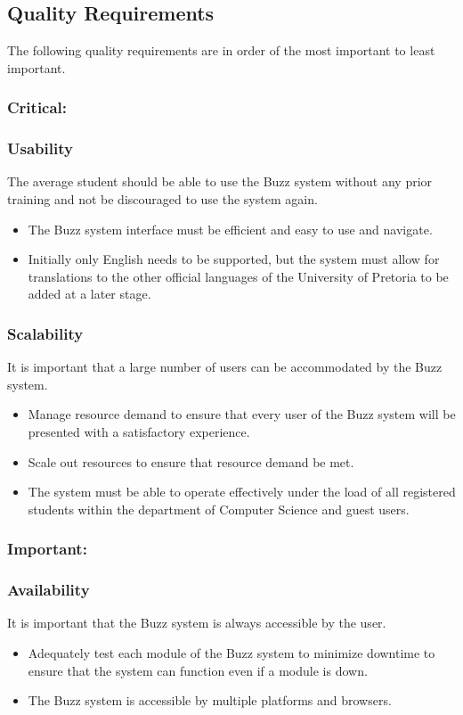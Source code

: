 \documentclass[12pt, oneside]{article}
\begin{document}
	\subsection{Quality Requirements}
	
	The following quality requirements are in order of the most important to least important.	
	\subsubsection{Critical:}
	\subsubsection*{Usability}
	The average student should be able to use the Buzz system without any prior training and not be discouraged to use the system again. 
	\begin{itemize}
		\item The Buzz system interface must be efficient and easy to use and navigate.
		\item Initially only English needs to be supported, but the system must allow for translations to the other official languages of the University of Pretoria to be added at a later stage.
	\end{itemize}
	
	\subsubsection*{Scalability}
	It is important that a large number of users can be accommodated by the Buzz system.
	\begin{itemize} 
		\item Manage resource demand to ensure that every user of the Buzz system will be presented with a satisfactory experience.
		\item Scale out resources to ensure that resource demand be met.
		\item The system must be able to operate effectively under the load of all registered students within the department of Computer Science and guest users.
	\end{itemize}
	
	
	\subsubsection{Important:}
	\subsubsection*{Availability}
	It is important that the Buzz system is always accessible by the user.
	\begin{itemize}
		\item Adequately test each module of the Buzz system to minimize downtime to ensure that the system can function even if a module is down.
		\item The Buzz system is accessible by multiple platforms and browsers.
	\end{itemize}
	
\end{document}
